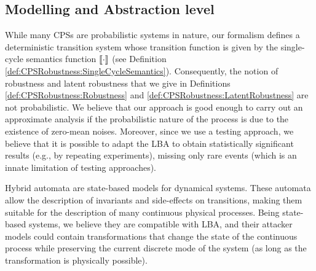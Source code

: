 {{\subsection{Modelling and Abstraction level}
While many CPSs are probabilistic systems in nature, our formalism defines a deterministic transition system whose transition function is given by the single-cycle semantics function ${{{\llbracket\cdot\rrbracket}}}$ (see Definition \ref{def:CPSRobustness:SingleCycleSemantics}). Consequently, the notion of robustness and latent robustness that we give in Definitions \ref{def:CPSRobustness:Robustness} and \ref{def:CPSRobustness:LatentRobustness} are not probabilistic. We believe that our approach is good enough to carry out an approximate analysis if the probabilistic nature of the process is due to the existence of zero-mean noises. Moreover, since we use a testing approach, we believe that it is possible to adapt the LBA to obtain statistically significant results (e.g., by repeating experiments), missing only rare events (which is an innate limitation of testing approaches).

{Hybrid automata} \cite{ALUR19953} are state-based models for dynamical systems. These automata allow the description of invariants and side-effects on transitions, making them suitable for the description of many continuous physical processes. Being state-based systems, we believe they are compatible with LBA, and their attacker models could contain transformations that change the state of the continuous process while preserving the current discrete mode of the system (as long as the transformation is physically possible). %


}}
